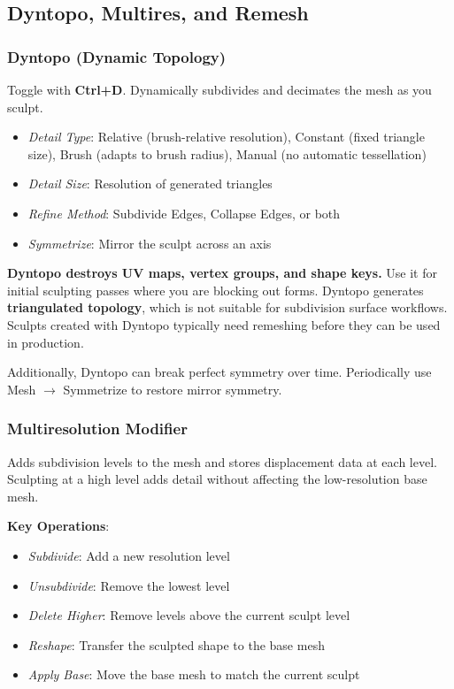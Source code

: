 \subsection{Dyntopo, Multires, and Remesh}
\label{sec:multires}

\subsubsection{Dyntopo (Dynamic Topology)}

Toggle with \textbf{Ctrl+D}. Dynamically subdivides and decimates the mesh as you sculpt.

\begin{itemize}[leftmargin=2em]
  \item \textit{Detail Type}: Relative (brush-relative resolution), Constant (fixed triangle size), Brush (adapts to brush radius), Manual (no automatic tessellation)
  \item \textit{Detail Size}: Resolution of generated triangles
  \item \textit{Refine Method}: Subdivide Edges, Collapse Edges, or both
  \item \textit{Symmetrize}: Mirror the sculpt across an axis
\end{itemize}

\begin{warningbox}
\textbf{Dyntopo destroys UV maps, vertex groups, and shape keys.} Use it for initial sculpting passes where you are blocking out forms. Dyntopo generates \textbf{triangulated topology}, which is not suitable for subdivision surface workflows. Sculpts created with Dyntopo typically need remeshing before they can be used in production.

Additionally, Dyntopo can break perfect symmetry over time. Periodically use Mesh $\rightarrow$ Symmetrize to restore mirror symmetry.
\end{warningbox}

\subsubsection{Multiresolution Modifier}

Adds subdivision levels to the mesh and stores displacement data at each level. Sculpting at a high level adds detail without affecting the low-resolution base mesh.

\textbf{Key Operations}:
\begin{itemize}[leftmargin=2em]
  \item \textit{Subdivide}: Add a new resolution level
  \item \textit{Unsubdivide}: Remove the lowest level
  \item \textit{Delete Higher}: Remove levels above the current sculpt level
  \item \textit{Reshape}: Transfer the sculpted shape to the base mesh
  \item \textit{Apply Base}: Move the base mesh to match the current sculpt
\end{itemize}

